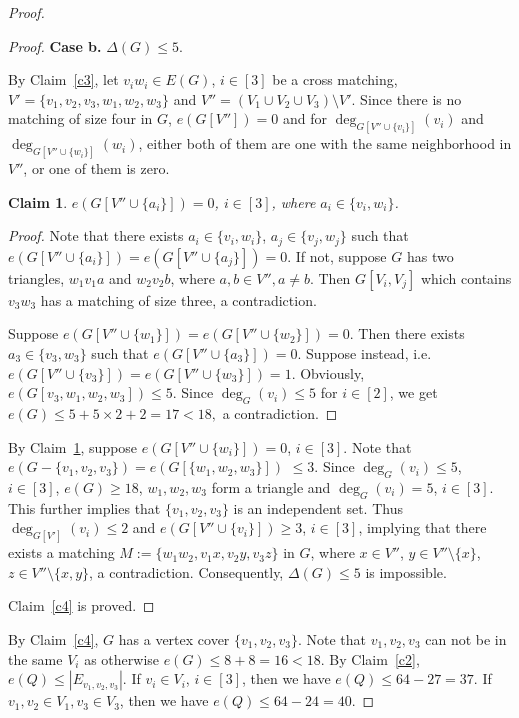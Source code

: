 \documentclass[11pt, reqno]{amsart}    	%
\newtheorem{claim}[thm]{Claim}
\theoremstyle{definition}
\numberwithin{equation}{section}
\begin{document}
\begin{proof}
\begin{proof}
			
			\medskip		
			\textbf{Case b.}  $\Delta(G) \le 5 .$
			
			By Claim~\ref{c3}, let $v_{i}w_{i}\in E(G)$, $i\in [3] $ be a cross matching, $V'=\{ v_{1},v_{2},v_{3},w_{1},w_{2},w_{3}\}$ and $V''=(V_1\cup V_{2} \cup V_3) \setminus V'$. Since there is no matching of size four in $G$, $e(G[V''])=0$ and for $\deg_{G[V''\cup\{v_{i}\}]}(v_{i})$ and  $\deg_{G[V''\cup\{w_{i}\}]}(w_{i})$, either both of them are one with the same neighborhood in $V''$, or one of them is zero.  
			\begin{claim} \label{c5}
				$ e(G[V''\cup\{a_{i}\}])=0$, $i\in [3] $, where $a_i\in \{v_i,w_i\}$.
			\end{claim}
			\begin{proof} Note that there exists $a_i\in \{v_i,w_i\}$, $a_j\in \{v_j,w_j\}$ such that $ e(G[V''\cup\{a_i\}])=e(G[V''\cup\{a_j\}])=0$. If not, suppose $G$ has two triangles, $w_1v_1a$ and $w_2v_2b$, where $a,b \in V'',a\not= b$. Then $G[V_i,V_j]$ which contains $v_{3}w_{3}$ has a matching of size three, a contradiction.
				
				Suppose  $e(G[V''\cup\{w_1\}])=e(G[V''\cup\{w_2\}])=0$.  Then there exists $a_3\in \{v_3,w_3\}$ such that $ e(G[V''\cup\{a_3\}])=0$. Suppose instead, i.e. 	$e(G[V''\cup\{v_{3}\}])=e(G[V''\cup\{w_{3}\}])=1 $.
				Obviously, $e(G[v_3,w_1,w_2,w_3])\le 5$. Since $\deg_G(v_i) \le 5$ for $i\in[2]$, we get $ e(G)\le 5+5\times2+2=17<18,$ a contradiction.\end{proof}
			
			
			
			By Claim~\ref{c5}, suppose $ e(G[V''\cup\{w_{i}\}])=0$, $i\in [3] $. Note that $ e(G-\{v_1,v_2,v_3\})=e(G[\{w_1,w_2,w_3\}])$ $\le3 $.
			Since  $\deg_{G}(v_i)\le 5$, $i\in [3] $, $e(G)\ge 18$, $ w_1,w_2,w_3 $ form a triangle and  $\deg_{G}(v_i)= 5$, $i\in [3] $.  This further implies that $ \{v_1,v_2,v_3\} $ is an independent set. Thus $\deg_{G[V']}(v_i)\le 2$ and $ e(G[V''\cup\{v_{i}\}]) \ge3$, $ i\in[3]$,  implying that there exists a matching $M:=\{w_1w_2,v_1x,v_2y,v_3z	\}$ in $G$,  where $x\in V''$, $y\in  V''\setminus \{x\}$, $z\in  V'' \setminus \{x,y\}$,  a contradiction.  Consequently,  $\Delta(G) \le 5$ is impossible.
			
			Claim~\ref{c4} is proved.
		\end{proof}
		
		
		
		
		
		By Claim~\ref{c4}, $G$ has a vertex cover  $\{ v_{1},v_{2},v_{3}\}$.
		Note that $v_{1},v_{2},v_{3}$ can not be in the same $V_i$ as otherwise $e(G)\le 8+8=16<18$.
		By Claim~\ref{c2}, $e(Q)\le |E_{v_{1},v_{2},v_{3}}|$.
		If $ v_{i}\in V_i$, $i\in[3]$, then we have  $  e(Q)\le 64-27=37 .$
		If $ v_{1},v_{2}\in V_1,v_{3}\in V_3$, then we have $  e(Q)\le 64-24=40 .$
		

\end{proof}
\end{document}
